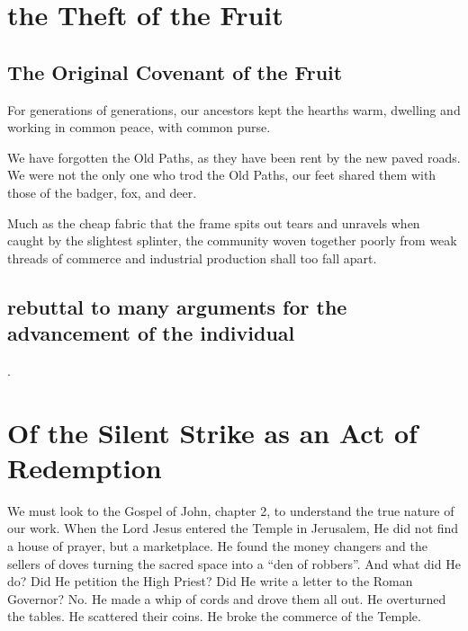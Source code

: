\section{the Theft of the Fruit}
\subsection{The Original Covenant of the Fruit}

For generations of generations, our ancestors kept the hearths warm, dwelling and working in common peace, with common purse.

We have forgotten the Old Paths, as they have been rent by the new paved roads.
We were not the only one who trod the Old Paths, our feet shared them with those of the badger, fox, and deer.

Much as the cheap fabric that the frame spits out tears and unravels when caught by the slightest splinter, the community woven together poorly from weak threads of commerce and industrial production shall too fall apart.


\subsection{rebuttal to many arguments for the advancement of the individual}

.

\section{Of the Silent Strike as an Act of Redemption}
We must look to the Gospel of John, chapter 2, to understand the true nature of our work.
When the Lord Jesus entered the Temple in Jerusalem, He did not find a house of prayer, but a marketplace.
He found the money changers and the sellers of doves turning the sacred space into a ``den of robbers''.
And what did He do? Did He petition the High Priest? Did He write a letter to the Roman Governor?
No. He made a whip of cords and drove them all out.
He overturned the tables. He scattered their coins.
He broke the commerce of the Temple.

